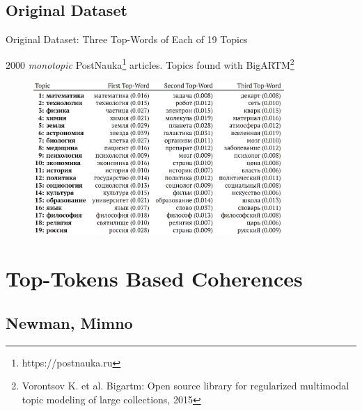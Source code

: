 \documentclass[russian]{beamer}
\begin{document}
\subsection{Original Dataset}

\begin{frame}{Original Dataset: Three Top-Words of Each of 19 Topics}

  {\small
    $2000$ \emph{monotopic} PostNauka\footnote[frame]{https://postnauka.ru} articles. Topics found with BigARTM\footnote[frame]{Vorontsov K. et al. Bigartm: Open source library for regularized multimodal topic modeling of large collections, 2015}
  }
  
  \begin{figure}[h]
    \centering
    \includegraphics[width=0.85\textwidth]{topwords.jpg}
  \end{figure}
\end{frame}

\section{Top-Tokens Based Coherences}


\subsection{Newman, Mimno}
\end{document}
